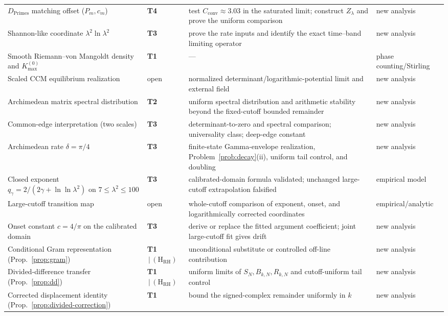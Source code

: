 \documentclass[11pt,a4paper]{article}
\begin{document}
{\begin{longtable}{@{}p{4.6cm} p{2.7cm} p{4.6cm} p{2.4cm}@{}}
$D_{\mathrm{Primes}}$ matching offset ($P_m,c_m$) & \textbf{T4} & test $C_{\mathrm{conv}}\approx3.03$ in the saturated limit; construct $Z_\lambda$ and prove the uniform comparison & new analysis \\
Shannon-like coordinate $\lambda^2\ln\lambda^2$ & \textbf{T3} & prove the rate inputs and identify the exact time--band limiting operator & new analysis \\
Smooth Riemann--von Mangoldt density and $K_{\max}^{(0)}$ & \textbf{T1} & --- & phase counting/Stirling \\
Scaled CCM equilibrium realization & open & normalized determinant/logarithmic-potential limit and external field & new analysis \\
Archimedean matrix spectral distribution & \textbf{T2} & uniform spectral distribution and arithmetic stability beyond the fixed-cutoff bounded remainder & new analysis \\
Common-edge interpretation (two scales) & \textbf{T3} & determinant-to-zero and spectral comparison; universality class; deep-edge constant & new analysis \\
Archimedean rate $\delta=\pi/4$ & \textbf{T3} & finite-state Gamma-envelope realization, Problem~\ref{prob:decay}(ii), uniform tail control, and doubling & new analysis \\
Closed exponent $q_\gamma=2/(2\gamma+\ln\ln\lambda^2)$ on $7\le\lambda^2\le100$ & \textbf{T3} & calibrated-domain formula validated; unchanged large-cutoff extrapolation falsified & empirical model \\
Large-cutoff transition map & open & whole-cutoff comparison of exponent, onset, and logarithmically corrected coordinates & empirical/analytic \\
Onset constant $c=4/\pi$ on the calibrated domain & \textbf{T3} & derive or replace the fitted argument coefficient; joint large-cutoff fit gives drift & new analysis \\
Conditional Gram representation (Prop.~\ref{prop:gram}) & \textbf{T1}$\,|\,(\mathrm{H}_{\mathrm{RH}})$ & unconditional substitute or controlled off-line contribution & new analysis \\
Divided-difference transfer (Prop.~\ref{prop:dd}) & \textbf{T1}$\,|\,(\mathrm{H}_{\mathrm{RH}})$ & uniform limits of $S_N,B_{k,N},R_{k,N}$ and cutoff-uniform tail control & new analysis \\
Corrected displacement identity (Prop.~\ref{prop:divided-correction}) & \textbf{T1} & bound the signed-complex remainder uniformly in $k$ & new analysis \\

\end{longtable}}
\end{document}
